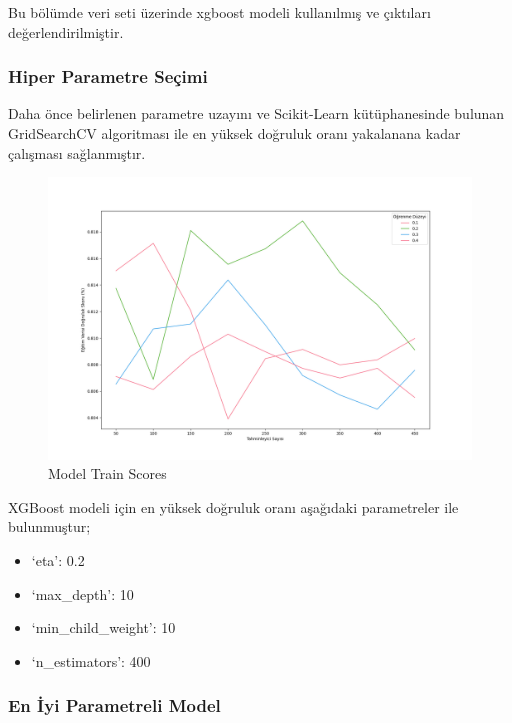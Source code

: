 \documentclass[12pt,twoside]{deuthesis}
\providecommand{\tightlist}{%
  \setlength{\itemsep}{0pt}\setlength{\parskip}{0pt}}
\begin{document}
Bu bölümde veri seti üzerinde xgboost modeli kullanılmış ve çıktıları değerlendirilmiştir.

\hypertarget{hiper-parametre-seuxe7imi-6}{%
\subsubsection{Hiper Parametre Seçimi}\label{hiper-parametre-seuxe7imi-6}}

Daha önce belirlenen parametre uzayını ve Scikit-Learn kütüphanesinde bulunan GridSearchCV algoritması ile en yüksek doğruluk oranı yakalanana kadar çalışması sağlanmıştır.
\begin{figure}

{\centering \includegraphics[width=1.1\linewidth,height=0.55\textheight]{figure/XGB_bin_Grid_Graph} 

}

\caption{Model Train Scores}\label{fig:unnamed-chunk-63}
\end{figure}
XGBoost modeli için en yüksek doğruluk oranı aşağıdaki parametreler ile bulunmuştur;
\begin{itemize}
\tightlist
\item
  `eta': 0.2\\
\item
  `max\_depth': 10\\
\item
  `min\_child\_weight': 10\\
\item
  `n\_estimators': 400\\
  \newpage  
\end{itemize}
\hypertarget{en-iyi-parametreli-model-4}{%
\subsubsection{En İyi Parametreli Model}\label{en-iyi-parametreli-model-4}}
\end{document}
